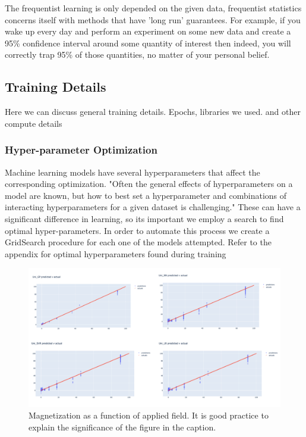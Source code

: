 \documentclass[journal,twoside,web]{ieeecolor}
\begin{document}
 The frequentist learning is only depended on the given data, frequentist statistics concerns itself with methods that have 'long run' guarantees. For example, if you wake up every day and perform an experiment on some new data and create a 95\% confidence interval around some quantity of interest then indeed, you will correctly trap 95\% of those quantities, no matter of your personal belief.

\subsection{Training Details}
Here we can discuss general training details. Epochs, libraries we used. 
and other compute details
\subsubsection{Hyper-parameter Optimization}
{Machine learning models have several hyperparameters that affect the corresponding optimization. "Often the general effects of hyperparameters on a model are known, but how to best set a hyperparameter and combinations of interacting hyperparameters for a given dataset is challenging."
These can have a significant difference in learning, so its important we employ a search to find optimal hyper-parameters. In order to automate this process we create a GridSearch procedure for each one of the models attempted.  Refer to the appendix for optimal hyperparameters  found during training }


\begin{figure}[!t]
\centerline{\includegraphics[width=15cm]{fig1.png}}
\caption{Magnetization as a function of applied field.
It is good practice to explain the significance of the figure in the caption.}
\label{fig1}
\end{figure}
\end{document}
